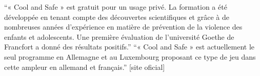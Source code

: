 ``« Cool and Safe » est gratuit pour un usage privé. La formation a été développée en tenant compte des découvertes scientifiques et grâce à de nombreuses années d'expérience en matière de prévention de la violence des enfants et adolescents. Une première évaluation de l'université Goethe de Francfort a donné des résultats positifs.'' ``« Cool and Safe » est actuellement le seul programme en Allemagne et au Luxembourg proposant ce type de jeu dans cette ampleur en allemand et français.'' [site oficial]













